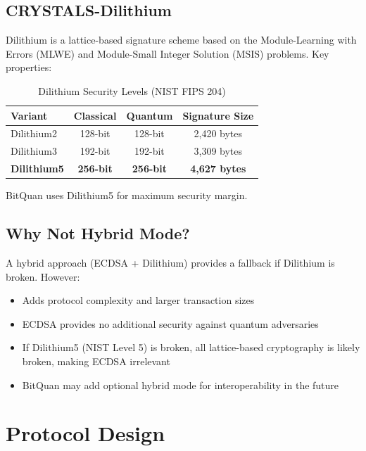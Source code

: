 \documentclass[11pt,a4paper]{article}
\begin{document}
\subsection{CRYSTALS-Dilithium}

Dilithium is a lattice-based signature scheme based on the Module-Learning with Errors (MLWE) and Module-Small Integer Solution (MSIS) problems. Key properties:

\begin{table}[H]
\centering
\caption{Dilithium Security Levels (NIST FIPS 204)}
\begin{tabular}{@{}lccc@{}}
\toprule
\textbf{Variant} & \textbf{Classical} & \textbf{Quantum} & \textbf{Signature Size} \\
\midrule
Dilithium2 & 128-bit & 128-bit & 2,420 bytes \\
Dilithium3 & 192-bit & 192-bit & 3,309 bytes \\
\textbf{Dilithium5} & \textbf{256-bit} & \textbf{256-bit} & \textbf{4,627 bytes} \\
\bottomrule
\end{tabular}
\end{table}

BitQuan uses Dilithium5 for maximum security margin.

\subsection{Why Not Hybrid Mode?}

A hybrid approach (ECDSA + Dilithium) provides a fallback if Dilithium is broken. However:

\begin{itemize}[leftmargin=*]
    \item Adds protocol complexity and larger transaction sizes
    \item ECDSA provides no additional security against quantum adversaries
    \item If Dilithium5 (NIST Level 5) is broken, all lattice-based cryptography is likely broken, making ECDSA irrelevant
    \item BitQuan may add optional hybrid mode for interoperability in the future
\end{itemize}

\section{Protocol Design}
\end{document}
